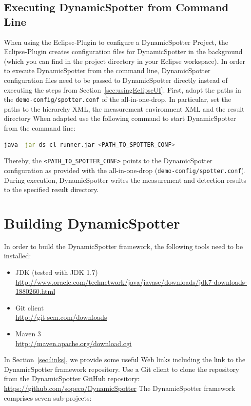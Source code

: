 \documentclass{report}
\newcommand{\DS}{DynamicSpotter }
\newcommand{\link}[1]{\textcolor[rgb]{0.0,0.0,1.0}{\href{#1}{#1}}}
\begin{document}
\subsection{Executing \DS from Command Line}
\label{sec:usingCommandLine}
When using the Eclipse-Plugin to configure a \DS Project, the Eclipse-Plugin creates configuration files for \DS in the
background (which you can find in the project directory in your Eclipse workspace).
In order to execute \DS from the command line, \DS configuration files need to be passed to \DS directly instead of
executing the steps from Section~\ref{sec:usingEclipseUI}. 
First, adapt the paths in the \texttt{demo-config/spotter.conf} of the all-in-one-drop. In particular, set the paths to
the hierarchy XML, the measurement environment XML and the result directory 
When adapted use the following command to start \DS from the command line:
\begin{lstlisting}[language=sh,morekeywords={java,javaagent,port, rootDir}, frame=single]
java -jar ds-cl-runner.jar <PATH_TO_SPOTTER_CONF>
\end{lstlisting}
Thereby, the \texttt{<PATH\_TO\_SPOTTER\_CONF>} points to the \DS configuration as provided with the all-in-one-drop
(\texttt{demo-config/spotter.conf}). During execution, \DS writes the measurement and detection results to the specified
result directory.



\section{Building \DS}
\label{sec:buildingDynamicSpotter}
In order to build the \DS framework, the following tools need to be installed:
\begin{itemize}
  \item JDK (tested with JDK
  1.7)\\ \link{http://www.oracle.com/technetwork/java/javase/downloads/jdk7-downloads-1880260.html}
  \item Git client \\ \link{http://git-scm.com/downloads}
  \item Maven 3 \\ \link{http://maven.apache.org/download.cgi}
\end{itemize}

In Section~\ref{sec:links}, we provide some useful Web links including the link to the \DS framework repository. 
Use a Git client to clone the repository from the \DS GitHub repository:
\newline
\newline
\link{https://github.com/sopeco/DynamicSpotter}
\newline
\newline
The \DS framework comprises seven sub-projects:
\end{document}
